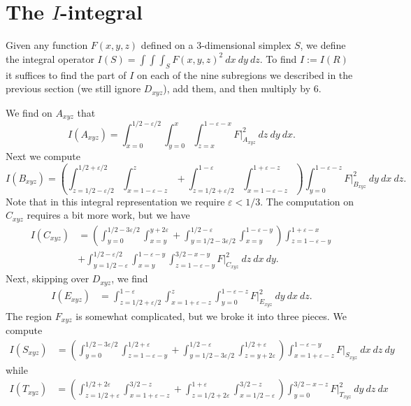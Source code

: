 \documentclass[12pt]{amsart}
\numberwithin{equation}{section}
\theoremstyle{plain}
\theoremstyle{definition}
\begin{document}
\section{The $I$-integral}

Given any function $F(x,y,z)$ defined on a 3-dimensional simplex $S$, we define the integral operator $I(S)=\int\int\int_{S}F(x,y,z)^2\ dx\ dy\ dz$.  To find $I:=I(R)$ it suffices to find the part of $I$ on each of the nine subregions we described in the previous section (we still ignore $D_{xyz}$), add them, and then multiply by 6.

We find on $A_{xyz}$ that
\[
I(A_{xyz})=\int_{x=0}^{1/2-\varepsilon/2}\int_{y=0}^{x}\int_{z=x}^{1-\varepsilon-x}F|_{A_{xyz}}^2\ dz\ dy\ dx.
\]
Next we compute
\[
I(B_{xyz})=\left(\int_{z=1/2-\varepsilon/2}^{1/2+\varepsilon/2}\int_{x=1-\varepsilon-z}^{z} +\int_{z=1/2+\varepsilon/2}^{1-\varepsilon}\int_{x=1-\varepsilon-z}^{1+\varepsilon-z}\right) \int_{y=0}^{1-\varepsilon-z}F|_{B_{xyz}}^2\ dy\ dx\ dz.
\]
Note that in this integral representation we require $\varepsilon<1/3$.  The computation on $C_{xyz}$ requires a bit more work, but we have
\begin{align*}
I(C_{xyz}) & = \left(\int_{y=0}^{1/2-3\varepsilon/2} \int_{x=y}^{y+2\varepsilon} + \int_{y=1/2-3\varepsilon/2}^{1/2-\varepsilon}\int_{x=y}^{1-\varepsilon-y} \right) \int_{z=1-\varepsilon-y}^{1+\varepsilon-x} \\ & + \int_{y=1/2-\varepsilon}^{1/2-\varepsilon/2}\int_{x=y}^{1-\varepsilon-y}\int_{z=1-\varepsilon-y}^{3/2-x-y} F|_{C_{xyz}}^2\ dz\ dx\ dy.
\end{align*}
Next, skipping over $D_{xyz}$, we find
\begin{align*}
I(E_{xyz}) & = \int_{z=1/2+\varepsilon/2}^{1-\varepsilon}\int_{x=1+\varepsilon-z}^{z}\int_{y=0}^{1-\varepsilon-z} F|_{E_{xyz}}^2\ dy\ dx\ dz.
\end{align*}
The region $F_{xyz}$ is somewhat complicated, but we broke it into three pieces.  We compute
\begin{align*}
I(S_{xyz}) & =  \left(\int_{y=0}^{1/2-3\varepsilon/2}\int_{z=1-\varepsilon-y}^{1/2+\varepsilon} +\int_{y=1/2-3\varepsilon/2}^{1/2-\varepsilon}\int_{z=y+2\varepsilon}^{1/2+\varepsilon} \right)\int_{x=1+\varepsilon-z}^{1-\varepsilon-y} F|_{S_{xyz}}\ dx\ dz\ dy
\end{align*}
while
\begin{align*}
I(T_{xyz}) &  = \left(\int_{z=1/2+\varepsilon}^{1/2+2\varepsilon}\int_{x=1+\varepsilon-z}^{3/2-z} + \int_{z=1/2+2\varepsilon}^{1+\varepsilon}\int_{x=1/2-\varepsilon}^{3/2-z}\right)\int_{y=0}^{3/2-x-z} F|_{T_{xyz}}^2\ dy\ dz\ dx
\end{align*}
\end{document}
